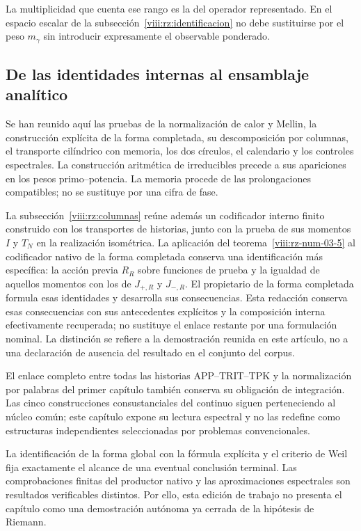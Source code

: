 La multiplicidad que cuenta ese rango es la del operador representado. En el espacio escalar de la subsección~\ref{viii:rz:identificacion} no debe sustituirse por el peso \(m_\gamma\) sin introducir expresamente el observable ponderado.

\subsection{De las identidades internas al ensamblaje analítico}
\label{viii:rz:alcance}
Se han reunido aquí las pruebas de la normalización de calor y Mellin, la construcción explícita de la forma completada, su descomposición por columnas, el transporte cilíndrico con memoria, los dos círculos, el calendario y los controles espectrales. La construcción aritmética de irreducibles precede a sus apariciones en los pesos primo–potencia. La memoria procede de las prolongaciones compatibles; no se sustituye por una cifra de fase.

La subsección~\ref{viii:rz:columnas} reúne además un codificador interno finito construido con los transportes de historias, junto con la prueba de sus momentos \(I\) y \(T_N\) en la realización isométrica. La aplicación del teorema~\ref{viii:rz-num-03-5} al codificador nativo de la forma completada conserva una identificación más específica: la acción previa \(R_R\) sobre funciones de prueba y la igualdad de aquellos momentos con los de \(J_{+,R}\) y \(J_{-,R}\). El propietario de la forma completada formula esas identidades y desarrolla sus consecuencias. Esta redacción conserva esas consecuencias con sus antecedentes explícitos y la composición interna efectivamente recuperada; no sustituye el enlace restante por una formulación nominal. La distinción se refiere a la demostración reunida en este artículo, no a una declaración de ausencia del resultado en el conjunto del corpus.

El enlace completo entre todas las historias APP–TRIT–TPK y la normalización por palabras del primer capítulo también conserva su obligación de integración. Las cinco construcciones consustanciales del continuo siguen perteneciendo al núcleo común; este capítulo expone su lectura espectral y no las redefine como estructuras independientes seleccionadas por problemas convencionales.

La identificación de la forma global con la fórmula explícita y el criterio de Weil fija exactamente el alcance de una eventual conclusión terminal. Las comprobaciones finitas del productor nativo y las aproximaciones espectrales son resultados verificables distintos. Por ello, esta edición de trabajo no presenta el capítulo como una demostración autónoma ya cerrada de la hipótesis de Riemann.

